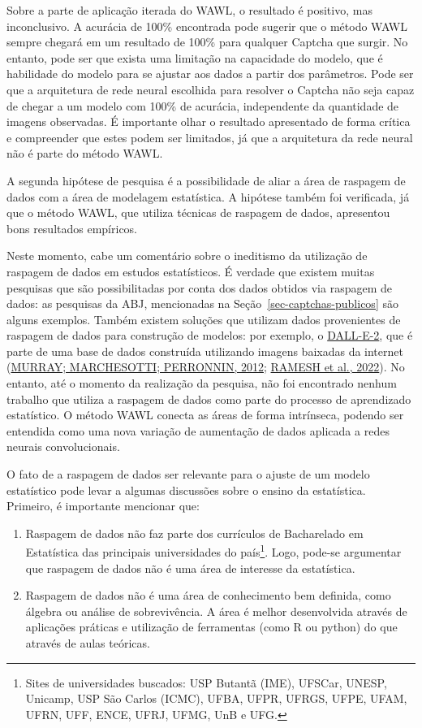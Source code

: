 \documentclass[12pt,twoside,brazilian]{book}
\providecommand{\tightlist}{%
  \setlength{\itemsep}{0pt}\setlength{\parskip}{0pt}}
\begin{document}
Sobre a parte de aplicação iterada do WAWL, o resultado é positivo, mas
inconclusivo. A acurácia de 100\% encontrada pode sugerir que o método
WAWL sempre chegará em um resultado de 100\% para qualquer Captcha que
surgir. No entanto, pode ser que exista uma limitação na capacidade do
modelo, que é habilidade do modelo para se ajustar aos dados a partir
dos parâmetros. Pode ser que a arquitetura de rede neural escolhida para
resolver o Captcha não seja capaz de chegar a um modelo com 100\% de
acurácia, independente da quantidade de imagens observadas. É importante
olhar o resultado apresentado de forma crítica e compreender que estes
podem ser limitados, já que a arquitetura da rede neural não é parte do
método WAWL.

A segunda hipótese de pesquisa é a possibilidade de aliar a área de
raspagem de dados com a área de modelagem estatística. A hipótese também
foi verificada, já que o método WAWL, que utiliza técnicas de raspagem
de dados, apresentou bons resultados empíricos.

Neste momento, cabe um comentário sobre o ineditismo da utilização de
raspagem de dados em estudos estatísticos. É verdade que existem muitas
pesquisas que são possibilitadas por conta dos dados obtidos via
raspagem de dados: as pesquisas da ABJ, mencionadas na
Seção~\ref{sec-captchas-publicos} são alguns exemplos. Também existem
soluções que utilizam dados provenientes de raspagem de dados para
construção de modelos: por exemplo, o
\href{https://openai.com/dall-e-2/}{DALL-E-2}, que é parte de uma base
de dados construída utilizando imagens baixadas da internet
(\protect\hyperlink{ref-murray2012}{MURRAY; MARCHESOTTI; PERRONNIN,
2012};
\protect\hyperlink{ref-rameshHierarchicalTextConditionalImage2022}{RAMESH
et al., 2022}). No entanto, até o momento da realização da pesquisa, não
foi encontrado nenhum trabalho que utiliza a raspagem de dados como
parte do processo de aprendizado estatístico. O método WAWL conecta as
áreas de forma intrínseca, podendo ser entendida como uma nova variação
de aumentação de dados aplicada a redes neurais convolucionais.

O fato de a raspagem de dados ser relevante para o ajuste de um modelo
estatístico pode levar a algumas discussões sobre o ensino da
estatística. Primeiro, é importante mencionar que:

\begin{enumerate}
\def\labelenumi{\arabic{enumi}.}
\tightlist
\item
  Raspagem de dados não faz parte dos currículos de Bacharelado em
  Estatística das principais universidades do país\footnote{Sites de
    universidades buscados: USP Butantã (IME), UFSCar, UNESP, Unicamp,
    USP São Carlos (ICMC), UFBA, UFPR, UFRGS, UFPE, UFAM, UFRN, UFF,
    ENCE, UFRJ, UFMG, UnB e UFG.}. Logo, pode-se argumentar que raspagem
  de dados não é uma área de interesse da estatística.
\item
  Raspagem de dados não é uma área de conhecimento bem definida, como
  álgebra ou análise de sobrevivência. A área é melhor desenvolvida
  através de aplicações práticas e utilização de ferramentas (como R ou
  python) do que através de aulas teóricas.
\end{enumerate}
\end{document}
